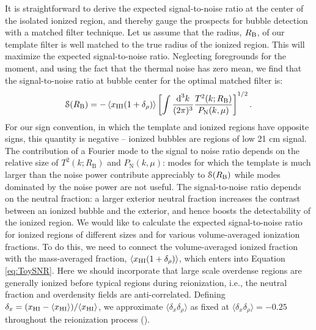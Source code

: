 It is straightforward to derive the expected signal-to-noise ratio at the center
of the isolated ionized region, and thereby gauge the prospects for bubble detection with
a matched filter technique. Let us assume that the radius, $R_{\rm B}$, of our template filter
is well matched to the true radius of the ionized region. This will maximize the expected
signal-to-noise ratio. Neglecting foregrounds for the moment, and using the fact that
the thermal noise has zero mean, we find that the signal-to-noise ratio at bubble center
for the optimal matched filter is: 
\begin{equation} \mathcal{S}(R_{\text{B}}) = - \left\langle x_{\text{HI}} (1 + \delta_\rho) \right\rangle \left[\int \frac{\text{d}^3 k}{(2\pi)^3}\frac{T^2(k;R_{\text{B}})}{P_{\text{N}}(k,\mu)}\right]^{1/2}. \label{eq:ToySNR} \end{equation}
For our sign convention, in which the template and ionized regions have opposite signs, this quantity is 
negative -- ionized bubbles are regions of low 21 cm signal. The contribution of a Fourier mode to the signal to noise
ratio
depends on the relative size of $T^2(k;R_{\text{B}})$ and $P_{\text{N}}(k,\mu)$: modes for which the
template is much larger than the noise power contribute appreciably to $\mathcal{S}(R_{\text B})$ while
modes dominated by the noise power are not useful. The signal-to-noise ratio depends on the
neutral fraction: a larger exterior neutral fraction increases the contrast between
an ionized bubble and the exterior, and hence boosts the detectability of the
ionized region. 
We would like to calculate the expected signal-to-noise ratio for ionized regions of different sizes and
for various volume-averaged
ionization fractions. To do this, we need to connect the volume-averaged ionized fraction with 
the mass-averaged fraction, $\langle x_{\rm HI} (1 + \delta_\rho)\rangle$, which enters into Equation \ref{eq:ToySNR}.
Here we should incorporate that large scale overdense regions are generally ionized before typical regions
during reionization, i.e., the neutral fraction and overdensity fields are anti-correlated. Defining $\delta_x = (x_{\rm HI} - \langle x_{\rm HI}\rangle)/\langle x_{\rm HI}\rangle$,
we approximate $\langle \delta_x \delta_\rho \rangle$ as fixed at $\langle \delta_x \delta_\rho\rangle = -0.25$ throughout
the reionization process (\citealt{Lidz:2006vj}). 

